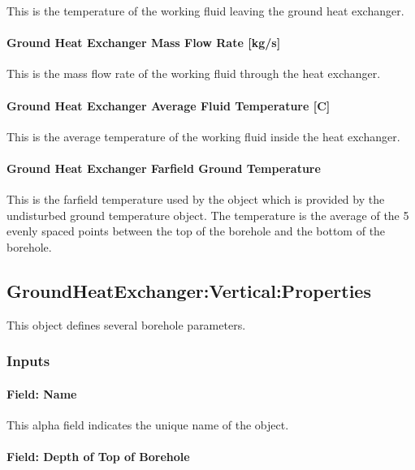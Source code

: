 This is the temperature of the working fluid leaving the ground heat exchanger.

\paragraph{Ground Heat Exchanger Mass Flow Rate {[}kg/s{]}}\label{ground-heat-exchanger-mass-flow-rate-kgs}

This is the mass flow rate of the working fluid through the heat exchanger.

\paragraph{Ground Heat Exchanger Average Fluid Temperature {[}C{]}}\label{ground-heat-exchanger-average-fluid-temperature-c}

This is the average temperature of the working fluid inside the heat exchanger.

\paragraph{Ground Heat Exchanger Farfield Ground Temperature}

This is the farfield temperature used by the object which is provided by the undisturbed ground temperature object. The temperature is the average of the 5 evenly spaced points between the top of the borehole and the bottom of the borehole.

\subsection{GroundHeatExchanger:Vertical:Properties}\label{groundheatexchangerverticalproperties}

This object defines several borehole parameters.

\subsubsection{Inputs}

\paragraph{Field: Name}

This alpha field indicates the unique name of the object.

\paragraph{Field: Depth of Top of Borehole}

